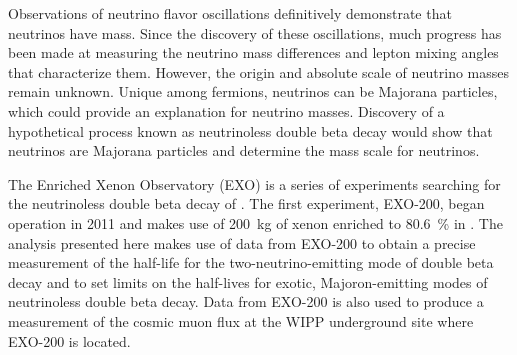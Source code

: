 Observations of neutrino flavor oscillations definitively demonstrate that neutrinos have mass. Since the discovery of these oscillations, much progress has been made at measuring the neutrino mass differences and lepton mixing angles that characterize them. However, the origin and absolute scale of neutrino masses remain unknown. Unique among fermions, neutrinos can be Majorana particles, which could provide an explanation for neutrino masses. Discovery of a hypothetical process known as neutrinoless double beta decay would show that neutrinos are Majorana particles and determine the mass scale for neutrinos.

The Enriched Xenon Observatory (EXO) is a series of experiments searching for the neutrinoless double beta decay of . The first experiment, EXO-200, began operation in 2011 and makes use of \SI{200}{\kg} of xenon enriched to \SI{80.6}{\percent} in . The analysis presented here makes use of data from EXO-200 to obtain a precise measurement of the half-life for the two-neutrino-emitting mode of double beta decay and to set limits on the half-lives for exotic, Majoron-emitting modes of neutrinoless double beta decay. Data from EXO-200 is also used to produce a measurement of the cosmic muon flux at the WIPP underground site where EXO-200 is located.
